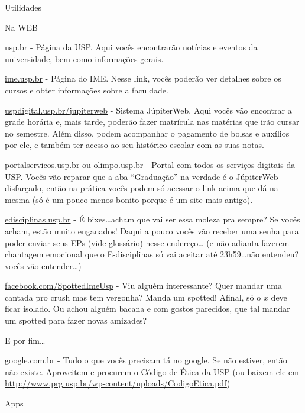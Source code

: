 \begin{secao}{Utilidades}

\begin{subsecao}{Na WEB}

\url{usp.br} - Página da USP. Aqui vocês encontrarão notícias e eventos da
universidade, bem como informações gerais.

\url{ime.usp.br} - Página do IME. Nesse link, vocês poderão ver detalhes sobre
os cursos e obter informações sobre a faculdade.

\url{uspdigital.usp.br/jupiterweb} - Sistema JúpiterWeb. Aqui vocês vão
encontrar a grade horária e, mais tarde, poderão fazer matrícula nas matérias
que irão cursar no semestre. Além disso, podem acompanhar o pagamento de
bolsas e auxílios por ele, e também ter acesso ao seu histórico escolar com
as suas notas.

\url{portalservicos.usp.br} ou \url{olimpo.usp.br} - Portal com todos os
serviços digitais da USP. Vocês vão reparar que a aba ``Graduação'' na verdade
é o JúpiterWeb disfarçado, então na prática vocês podem só acessar o link acima
que dá na mesma (só é um pouco menos bonito porque é um site mais antigo).

\url{edisciplinas.usp.br} - É bixes\dots acham que vai ser essa moleza pra
sempre? Se vocês acham, estão muito enganados! Daqui a pouco vocês vão receber
uma senha para poder enviar seus EPs (vide glossário) nesse endereço\dots
(e não adianta fazerem chantagem emocional que o E-disciplinas só vai aceitar
até 23h59\dots não entendeu? vocês vão entender\dots)

\url{facebook.com/SpottedImeUsp} - Viu alguém interessante? Quer mandar uma
cantada pro crush mas tem vergonha? Manda um spotted! Afinal, só o $x$ deve
ficar isolado. Ou achou alguém bacana e com gostos parecidos, que tal mandar um
spotted para fazer novas amizades?


E por fim\dots

\url{google.com.br} - Tudo o que vocês precisam tá no google. Se não
estiver, então não existe. Aproveitem e procurem o Código de Ética da USP (ou
baixem ele em \url{http://www.prg.usp.br/wp-content/uploads/CodigoEtica.pdf})

\end{subsecao}

\begin{subsecao}{Apps}
	

\end{subsecao}
\end{secao}
